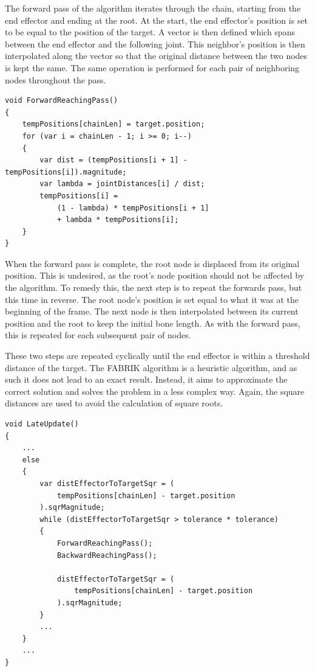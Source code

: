 The forward pass of the algorithm iterates through the chain, starting from the
end effector and ending at the root. At the start, the end effector's position
is set to be equal to the position of the target. A vector is then defined which
spans between the end effector and the following joint. This neighbor's position
is then interpolated along the vector so that the original distance between the
two nodes is kept the same. The same operation is performed for each pair of
neighboring nodes throughout the pass. 

\begin{lstlisting}[basicstyle=\footnotesize, numbers=none,frame=single,
caption={FABRIK forward reaching pass},captionpos=b, label=forwards, language={[Sharp]c}]
void ForwardReachingPass()
{
    tempPositions[chainLen] = target.position;
    for (var i = chainLen - 1; i >= 0; i--)
    {
        var dist = (tempPositions[i + 1] - tempPositions[i]).magnitude;
        var lambda = jointDistances[i] / dist;
        tempPositions[i] =
            (1 - lambda) * tempPositions[i + 1]
            + lambda * tempPositions[i];
    }
}
\end{lstlisting}

When the forward pass is complete, the root node is displaced from its original
position. This is undesired, as the root's node position should not be affected
by the algorithm. To remedy this, the next step is to repeat the forwards pass,
but this time in reverse. The root node's position is set equal to what it was
at the beginning of the frame. The next node is then interpolated between its
current position and the root to keep the initial bone length. As with the
forward pass, this is repeated for each subsequent pair of nodes. 

These two steps are repeated cyclically until the end effector is within
a threshold distance of the target. The FABRIK algorithm is a heuristic
algorithm, and as such it does not lead to an exact result. Instead, it aims to
approximate the correct solution and solves the problem in a less complex way.
Again, the square distances are used to avoid the calculation of square roots. 


\begin{lstlisting}[basicstyle=\footnotesize, numbers=none,frame=single,
caption={Main iteration loop of FABRIK},captionpos=b, label=full_loop,
language={[Sharp]c}, float=tp]
void LateUpdate()
{
    ...
    else
    {
        var distEffectorToTargetSqr = (
            tempPositions[chainLen] - target.position
        ).sqrMagnitude;
        while (distEffectorToTargetSqr > tolerance * tolerance)
        {
            ForwardReachingPass();
            BackwardReachingPass();

            distEffectorToTargetSqr = (
                tempPositions[chainLen] - target.position
            ).sqrMagnitude;
        }
        ...
    }
    ...
}
\end{lstlisting}


